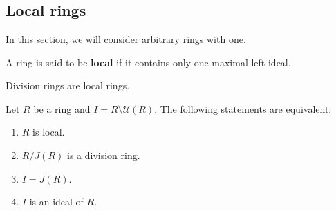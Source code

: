 \section{}
\label{09}

\subsection{Local rings}

In this section, we will consider arbitrary rings with one. 

\begin{definition}
    A ring is said to be \textbf{local} if it contains only one maximal left ideal. 
\end{definition}

Division rings are local rings. 


\begin{theorem}
\label{thm:local}
    Let $R$ be a ring and $I=R\setminus\mathcal{U}(R)$. The following
    statements are equivalent:
    \begin{enumerate}
        \item $R$ is local.
        \item $R/J(R)$ is a division ring.
        \item $I=J(R)$.
        \item $I$ is an ideal of $R$.
    \end{enumerate}
\end{theorem}

